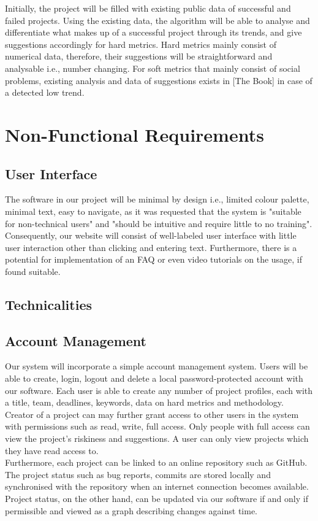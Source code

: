 \documentclass[a4paper]{article}
\theoremstyle{plain}
\theoremstyle{definition}
\theoremstyle{remark}
\begin{document}
\noindent Initially, the project will be filled with existing public data of successful and failed projects. Using the existing data, the algorithm will be able to analyse and differentiate what makes up of a successful project through its trends, and give suggestions accordingly for hard metrics. Hard metrics mainly consist of numerical data, therefore, their suggestions will be straightforward and analysable i.e., number changing. For soft metrics that mainly consist of social problems, existing analysis and data of suggestions exists in [The Book] in case of a detected low trend.\\

\hline
\section{Non-Functional Requirements}
\subsection{User Interface}
The software in our project will be minimal by design i.e., limited colour palette, minimal text, easy to navigate, as it was requested that the system is "suitable for non-technical users" and "should be intuitive and require little to no training". Consequently, our website will consist of well-labeled user interface with little user interaction other than clicking and entering text. Furthermore, there is a potential for implementation of an FAQ or even video tutorials on the usage, if found suitable. \\
\subsection{Technicalities}

\subsection{Account Management}
Our system will incorporate a simple account management system. Users will be able to create, login, logout and delete a local password-protected account with our software. Each user is able to create any number of project profiles, each with a title, team, deadlines, keywords, data on hard metrics and methodology. Creator of a project can may further grant access to other users in the system with permissions such as read, write, full access. Only people with full access can view the project's riskiness and suggestions. A user can only view projects which they have read access to. \\

\noindent Furthermore, each project can be linked to an online repository such as GitHub. The project status such as bug reports, commits are stored locally and synchronised with the repository  when an internet connection becomes available. Project status, on the other hand, can be updated via our software if and only if permissible and viewed as a graph describing changes against time. 
\end{document}
